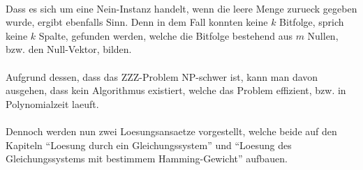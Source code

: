\documentclass[a4paper,10pt,ngerman]{scrartcl}
\begin{document}
\\Dass es sich um eine Nein-Instanz handelt, wenn die leere Menge zurueck gegeben wurde, ergibt ebenfalls Sinn. Denn in dem Fall konnten keine $k$ Bitfolge, sprich keine $k$ Spalte, gefunden werden, welche die Bitfolge bestehend aus $m$ Nullen, bzw. den Null-Vektor, bilden.
\\
\\
Aufgrund dessen, dass das ZZZ-Problem NP-schwer ist, kann man davon ausgehen, dass kein Algorithmus existiert, welche das Problem effizient, bzw. in Polynomialzeit laeuft.\\
\\
Dennoch werden nun zwei Loesungsansaetze vorgestellt, welche beide auf den Kapiteln "`Loesung durch ein Gleichungssystem"' und "`Loesung des Gleichungssystems mit bestimmem Hamming-Gewicht"' aufbauen.
\end{document}
